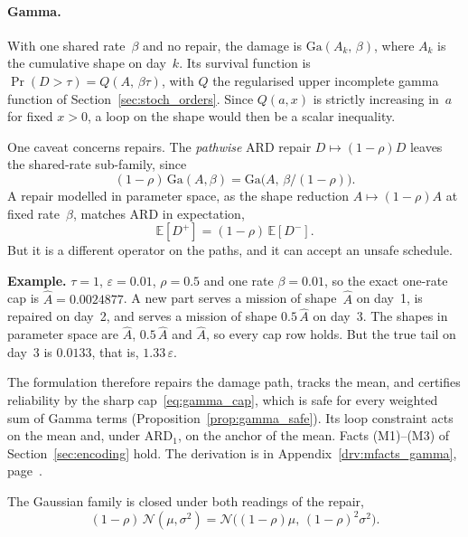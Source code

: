 \documentclass[11pt,a4paper]{article}
\theoremstyle{plain}
\theoremstyle{definition}
\theoremstyle{remark}
\begin{document}
\paragraph{Gamma.}
With one shared rate~$\beta$ and no repair, the damage is $\mathrm{Ga}(A_k,\,\beta)$, where $A_k$ is the cumulative shape on day~$k$.
Its survival function is $\Pr(D > \tau) = Q(A,\,\beta\tau)$, with $Q$ the regularised upper incomplete gamma function of Section~\ref{sec:stoch_orders}.
Since $Q(a,x)$ is strictly increasing in~$a$ for fixed $x > 0$, a loop on the shape would then be a scalar inequality.

One caveat concerns repairs.
The \emph{pathwise} ARD repair $D \mapsto (1-\rho)D$ leaves the shared-rate sub-family, since
\begin{equation}
  (1-\rho)\,\mathrm{Ga}(A,\beta) = \mathrm{Ga}\bigl(A,\,\beta/(1-\rho)\bigr).
\end{equation}
A repair modelled in parameter space, as the shape reduction $A \mapsto (1-\rho)A$ at fixed rate~$\beta$, matches ARD in expectation,
\begin{equation}
  \mathbb{E}[D^+] = (1-\rho)\,\mathbb{E}[D^-].
\end{equation}
But it is a different operator on the paths, and it can accept an unsafe schedule.

\begin{examplebox}
\textbf{Example.} $\tau = 1$, $\varepsilon = 0.01$, $\rho = 0.5$ and one rate $\beta = 0.01$, so the exact one-rate cap is $\hat A = 0.0024877$.
A new part serves a mission of shape~$\hat A$ on day~1, is repaired on day~2, and serves a mission of shape $0.5\,\hat A$ on day~3.
The shapes in parameter space are $\hat A$, $0.5\,\hat A$ and $\hat A$, so every cap row holds.
But the true tail on day~3 is $0.0133$, that is, $1.33\,\varepsilon$.
\end{examplebox}

The formulation therefore repairs the damage path, tracks the mean, and certifies reliability by the sharp cap~\eqref{eq:gamma_cap}, which is safe for every weighted sum of Gamma terms (Proposition~\ref{prop:gamma_safe}).
Its loop constraint acts on the mean and, under $\text{ARD}_1$, on the anchor of the mean.
Facts (M1)--(M3) of Section~\ref{sec:encoding} hold.
The derivation is in Appendix~\ref{drv:mfacts_gamma}, page~\pageref{drv:mfacts_gamma}.

The Gaussian family is closed under both readings of the repair,
\begin{equation}
  (1-\rho)\,\mathcal{N}(\mu,\sigma^2) = \mathcal{N}\bigl((1-\rho)\mu,\,(1-\rho)^2\sigma^2\bigr).
\end{equation}
\end{document}
